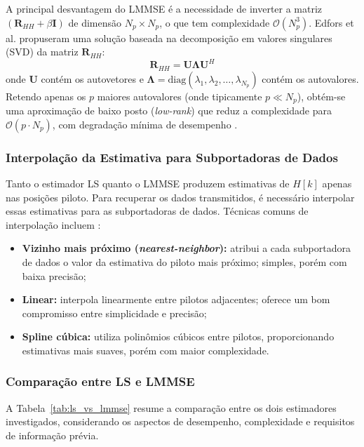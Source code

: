 \documentclass[conference]{IEEEtran}
\begin{document}
A principal desvantagem do LMMSE é a necessidade de inverter a matriz $(\mathbf{R}_{HH} + \beta\mathbf{I})$ de dimensão $N_p \times N_p$, o que tem complexidade $\mathcal{O}(N_p^3)$. Edfors et al. \cite{edfors1998} propuseram uma solução baseada na decomposição em valores singulares (SVD) da matriz $\mathbf{R}_{HH}$:
\begin{equation}
    \mathbf{R}_{HH} = \mathbf{U} \boldsymbol{\Lambda} \mathbf{U}^H
    \label{eq:svd}
\end{equation}
onde $\mathbf{U}$ contém os autovetores e $\boldsymbol{\Lambda} = \text{diag}(\lambda_1, \lambda_2, \ldots, \lambda_{N_p})$ contém os autovalores. Retendo apenas os $p$ maiores autovalores (onde tipicamente $p \ll N_p$), obtém-se uma aproximação de baixo posto (\textit{low-rank}) que reduz a complexidade para $\mathcal{O}(p \cdot N_p)$, com degradação mínima de desempenho \cite{edfors1998}.

\subsubsection{Interpolação da Estimativa para Subportadoras de Dados}

Tanto o estimador LS quanto o LMMSE produzem estimativas de $H[k]$ apenas nas posições piloto. Para recuperar os dados transmitidos, é necessário interpolar essas estimativas para as subportadoras de dados. Técnicas comuns de interpolação incluem \cite{hsieh1998}:
\begin{itemize}
    \item \textbf{Vizinho mais próximo (\textit{nearest-neighbor}):} atribui a cada subportadora de dados o valor da estimativa do piloto mais próximo; simples, porém com baixa precisão;
    \item \textbf{Linear:} interpola linearmente entre pilotos adjacentes; oferece um bom compromisso entre simplicidade e precisão;
    \item \textbf{Spline cúbica:} utiliza polinômios cúbicos entre pilotos, proporcionando estimativas mais suaves, porém com maior complexidade.
\end{itemize}

\subsubsection{Comparação entre LS e LMMSE}

A Tabela~\ref{tab:ls_vs_lmmse} resume a comparação entre os dois estimadores investigados, considerando os aspectos de desempenho, complexidade e requisitos de informação prévia.
\end{document}
